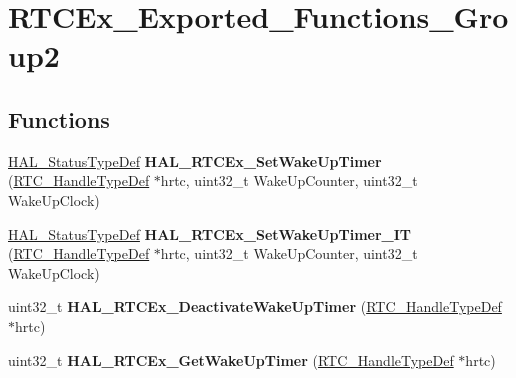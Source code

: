 \hypertarget{group___r_t_c_ex___exported___functions___group2}{}\section{R\+T\+C\+Ex\+\_\+\+Exported\+\_\+\+Functions\+\_\+\+Group2}
\label{group___r_t_c_ex___exported___functions___group2}
\subsection*{Functions}
\begin{DoxyCompactItemize}
\item 
\mbox{\label{group___r_t_c_ex___exported___functions___group2_gab22373ae0d2eeb1322569c44c42ee9db}} 
\hyperlink{stm32f4xx__hal__def_8h_a63c0679d1cb8b8c684fbb0632743478f}{H\+A\+L\+\_\+\+Status\+Type\+Def} {\bfseries H\+A\+L\+\_\+\+R\+T\+C\+Ex\+\_\+\+Set\+Wake\+Up\+Timer} (\hyperlink{struct_r_t_c___handle_type_def}{R\+T\+C\+\_\+\+Handle\+Type\+Def} $\ast$hrtc, uint32\+\_\+t Wake\+Up\+Counter, uint32\+\_\+t Wake\+Up\+Clock)
\item 
\mbox{\label{group___r_t_c_ex___exported___functions___group2_ga92f7781781a2fd96991ca932377418da}} 
\hyperlink{stm32f4xx__hal__def_8h_a63c0679d1cb8b8c684fbb0632743478f}{H\+A\+L\+\_\+\+Status\+Type\+Def} {\bfseries H\+A\+L\+\_\+\+R\+T\+C\+Ex\+\_\+\+Set\+Wake\+Up\+Timer\+\_\+\+IT} (\hyperlink{struct_r_t_c___handle_type_def}{R\+T\+C\+\_\+\+Handle\+Type\+Def} $\ast$hrtc, uint32\+\_\+t Wake\+Up\+Counter, uint32\+\_\+t Wake\+Up\+Clock)
\item 
\mbox{\label{group___r_t_c_ex___exported___functions___group2_ga48a0ebb678effede4fca4436e20b18f0}} 
uint32\+\_\+t {\bfseries H\+A\+L\+\_\+\+R\+T\+C\+Ex\+\_\+\+Deactivate\+Wake\+Up\+Timer} (\hyperlink{struct_r_t_c___handle_type_def}{R\+T\+C\+\_\+\+Handle\+Type\+Def} $\ast$hrtc)
\item 
\mbox{\label{group___r_t_c_ex___exported___functions___group2_gae2aa87c6544a982c4e7657d649e7a797}} 
uint32\+\_\+t {\bfseries H\+A\+L\+\_\+\+R\+T\+C\+Ex\+\_\+\+Get\+Wake\+Up\+Timer} (\hyperlink{struct_r_t_c___handle_type_def}{R\+T\+C\+\_\+\+Handle\+Type\+Def} $\ast$hrtc)

\end{DoxyCompactItemize}
